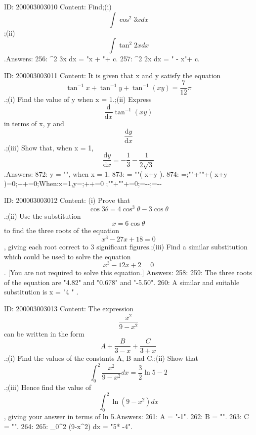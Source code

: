 \documentclass{article}
\begin{document}
ID: 200003003010
Content:
Find;(i) \[\int \cos^2 3x dx\] ;(ii) \[\int \tan^2 2x dx\].Answers:
256: \int \cos^2 3x dx = "x +  "+ c.
257: \int \tan^2 2x dx = "  - x"+ c.

ID: 200003003011
Content:
It is given that x and y satisfy the equation \[\tan^{-1} x + \tan^{-1} y + \tan^{-1} (xy) = \frac{7}{12}\pi\].;(i) Find the value of y when x = 1.;(ii) Express \[\frac{\mathrm{d}}{\mathrm{d} x} \tan^{-1} (xy)\] in terms of x, y and \[\frac{\mathrm{d} y}{\mathrm{d} x}\].;(iii) Show that, when x = 1, \[\frac{\mathrm{d} y}{\mathrm{d} x} = -\frac{1}{3} - \frac{1}{2\sqrt{3}}\].Answers:
872: y = "", when x = 1.
873:  = ""\left( x+y \right).
874: =;""+""+\left( x+y \right)=0;++=0;When:x=1,y=;\Rightarrow {}++=0 ;""+""+=0;=--;\therefore {}=--

ID: 200003003012
Content:
(i) Prove that \[\cos 3\theta = 4\cos^3 \theta - 3\cos \theta\].;(ii) Use the substitution \[x = 6\cos \theta\] to find the three roots of the equation \[x^3 - 27x + 18 = 0\], giving each root correct to 3 significant figures.;(iii) Find a similar substitution which could be used to solve the equation \[x^3 - 12x + 2 = 0\]. [You are not required to solve this equation.] Answers:
258: 
259: The three roots of the equation are "4.82" and "0.678" and "-5.50".
260: A similar and suitable substitution is x = "4 \cos{\theta}" .

ID: 200003003013
Content:
The expression \[\frac{x^2}{9-x^2}\] can be written in the form \[A + \frac{B}{3 - x} + \frac{C}{3 + x}\].;(i) Find the values of the constants A, B and C.;(ii) Show that \[\int_{0}^{2} \frac{x^2}{9 - x^2} dx = \frac{3}{2}\ln 5 - 2\].;(iii) Hence find the value of \[\int_{0}^{2} \ln (9 - x^2) dx\], giving your answer in terms of ln 5.Answers:
261: A = "-1".
262: B = "".
263: C = "".
264: 
265: \int_0^2 \ln(9-x^2) dx = "5* -4".
\end{document}
